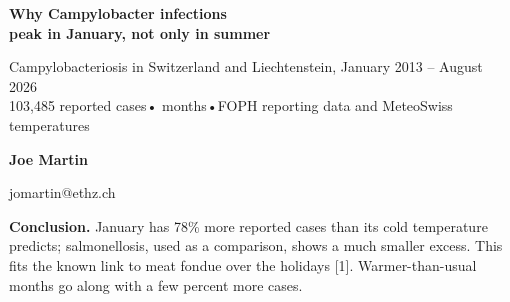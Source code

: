 \documentclass{article}
\newcommand{\Body}{\fontsize{18.5}{24}\selectfont}
\newcommand{\Small}{\fontsize{15.5}{20}\selectfont\color{ink2}}
\begin{document}
\Body

\begin{minipage}[t]{0.80\textwidth}\vspace{0pt}
  {\fontsize{56}{62}\selectfont\bfseries Why Campylobacter infections\\peak in January, not only in summer\par}
  \vspace{12pt}
  {\fontsize{24}{31}\selectfont\color{ink2} Campylobacteriosis in Switzerland and Liechtenstein, January 2013 -- August 2026\\
  103,485 reported cases\enspace• months\enspace•\enspace FOPH reporting data and MeteoSwiss temperatures\par}
\end{minipage}\hfill
\begin{minipage}[t]{0.18\textwidth}\vspace{0pt}\raggedleft
  \vspace{10pt}
  {\fontsize{24}{30}\selectfont\bfseries Joe Martin\par}
  {\Small jomartin@ethz.ch\par}
\end{minipage}

\vspace{12pt}{\color{ink}\rule{\textwidth}{2.5pt}}\vspace{8pt}

{\fontsize{21}{27}\selectfont\textbf{Conclusion.} January has 78\% more reported cases than its cold temperature predicts; salmonellosis, used as a comparison, shows a much smaller excess. This fits the known link to meat fondue over the holidays [1]. Warmer-than-usual months go along with a few percent more cases.\par}
\vspace{10pt}
\end{document}
